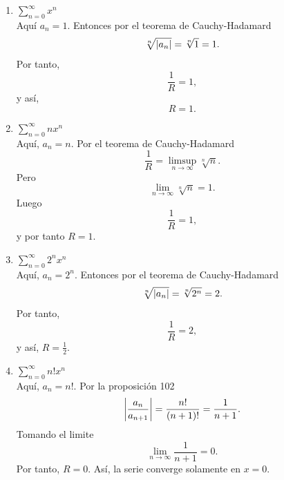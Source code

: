 \documentclass[12pt,a4paper]{article}
\begin{document}
    \begin{solucion}
        \begin{enumerate}
            \item[(a)] $\sum_{n=0}^{\infty}x^{n}$\\
            Aquí $a_{n}=1$. Entonces por el teorema de Cauchy-Hadamard
            \begin{equation*}
                \sqrt[n]{\abs{a_{n}}}=\sqrt[n]{1}=1.
            \end{equation*}
            Por tanto, 
            \begin{equation*}
                \frac{1}{R}=1,
            \end{equation*}
            y así,
            \begin{equation*}
                R=1.
            \end{equation*}
            \item[(b)] $\sum_{n=0}^{\infty}nx^{n}$\\
            Aquí, $a_{n}=n$. Por el teorema de Cauchy-Hadamard
            \begin{equation*}
                \frac{1}{R}=\limsup_{n\to\infty}\sqrt[n]{n}.
            \end{equation*}
            Pero
            \begin{equation*}
                \lim_{n\to\infty}\sqrt[n]{n}=1.
            \end{equation*}
            Luego
            \begin{equation*}
                \frac{1}{R}=1, 
            \end{equation*}
            y por tanto $R=1$.
            \item[(c)] $\sum_{n=0}^{\infty}2^{n}x^{n}$\\
            Aquí, $a_{n}=2^{n}$. Entonces por el teorema de Cauchy-Hadamard
            \begin{equation*}
                \sqrt[n]{\abs{a_{n}}}=\sqrt[n]{2^{n}}=2.
            \end{equation*}
            Por tanto,
            \begin{equation*}
                \frac{1}{R}=2,
            \end{equation*}
            y así, $R=\frac{1}{2}$.
            \item[(d)] $\sum_{n=0}^{\infty}n!x^{n}$\\
            Aquí, $a_{n}=n!$. Por la proposición 102
            \begin{equation*}
                \abs{\frac{a_{n}}{a_{n+1}}}=\frac{n!}{(n+1)!}=\frac{1}{n+1}.
            \end{equation*}
            Tomando el limite
            \begin{equation*}
                \lim_{n\to\infty}\frac{1}{n+1}=0.
            \end{equation*}
            Por tanto, $R=0$. Así, la serie converge solamente en $x=0$.
        \end{enumerate}
    \end{solucion}
\end{document}
